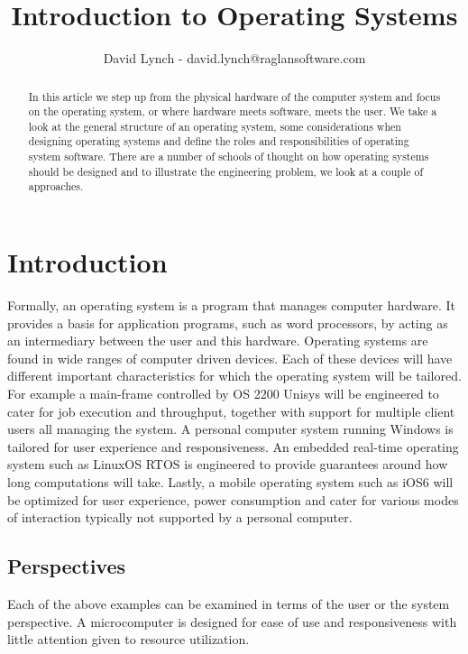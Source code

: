 \documentclass[10pt,a4paper]{article}
\title{Introduction to Operating Systems}
\author{David Lynch - david.lynch@raglansoftware.com }
\begin{document}
\maketitle
\begin{abstract}
In this article we step up from the physical hardware of the computer system and focus on the operating system, or where hardware meets software, meets the user. We take a look at the general structure of an operating system, some considerations when designing operating systems and define the roles and responsibilities of operating system software. There are a number of schools of thought on how operating systems should be designed and to illustrate the engineering problem, we look at a couple of approaches. 
\end{abstract}
\section{Introduction}
Formally, an operating system is a program that manages computer hardware. It provides a basis for application programs, such as word processors, by acting as an intermediary between the user and this hardware. Operating systems are found in wide ranges of computer driven devices. Each of these devices will have different important characteristics for which the operating system will be tailored. For example a main-frame controlled by OS 2200 Unisys will be engineered to cater for job execution and throughput, together with support for  multiple client users all managing the system. A personal computer system running Windows is tailored for user experience and responsiveness. An embedded real-time operating system such as LinuxOS RTOS is engineered to provide guarantees around how long computations will take. Lastly, a mobile operating system such as iOS6 will be optimized for user experience, power consumption and cater for various modes of interaction typically not supported by a personal computer.
\subsection{Perspectives}
Each of the above examples can be examined in terms of the user or the system perspective. A microcomputer is designed for ease of use and responsiveness with little attention given to resource utilization. 
\end{document}

